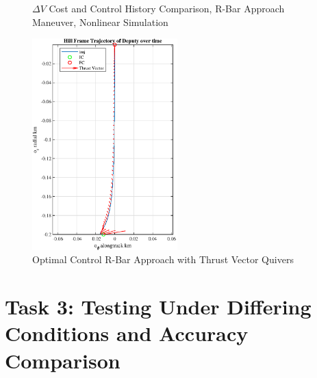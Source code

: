 \documentclass[conf]{new-aiaa}
\begin{document}
\begin{singlespace}
\begin{figure}[htpb!]
\begin{subfigure}{.5\textwidth}
\end{subfigure}
\caption{$\Delta V$ Cost and Control History Comparison, R-Bar Approach Maneuver, Nonlinear Simulation}
\label{fig:comps}
\end{figure}

\begin{figure}[!htbp] 
  \centering
  \includegraphics[width=0.5\textwidth]{figures/traj_quiv.eps}
  \caption{Optimal Control R-Bar Approach with Thrust Vector Quivers}
  \label{fig:tvc}
 \end{figure}



\clearpage
\section{Task 3: Testing Under Differing Conditions and Accuracy Comparison}


\end{singlespace}
\end{document}
